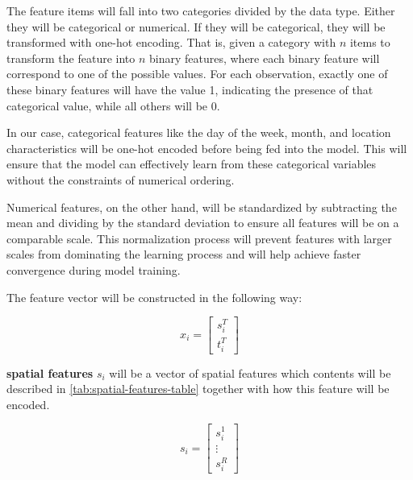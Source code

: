 The feature items will fall into two categories divided by the data type. Either they will be categorical or numerical. If they will be categorical, they will be transformed with one-hot encoding. That is, given a category with $n$ items to transform the feature into $n$ binary features, where each binary feature will correspond to one of the possible values. For each observation, exactly one of these binary features will have the value 1, indicating the presence of that categorical value, while all others will be 0.


In our case, categorical features like the day of the week, month, and location characteristics will be one-hot encoded before being fed into the model. This will ensure that the model can effectively learn from these categorical variables without the constraints of numerical ordering.

Numerical features, on the other hand, will be standardized by subtracting the mean and dividing by the standard deviation to ensure all features will be on a comparable scale. This normalization process will prevent features with larger scales from dominating the learning process and will help achieve faster convergence during model training.

The feature vector will be constructed in the following way:

\begin{equation}
    \renewcommand*{\arraystretch}{1.5}
    x_i = \begin{bmatrix}
        s_i^T \\
        t_i^T
    \end{bmatrix}
\end{equation}

\textbf{spatial features} $s_i$ will be a vector of spatial features which contents will be described in \ref{tab:spatial-features-table} together with how this feature will be encoded.

\begin{equation}
    s_i = \begin{bmatrix}
        s_i^1  \\
        \vdots \\
        s_i^R
    \end{bmatrix}
\end{equation}

